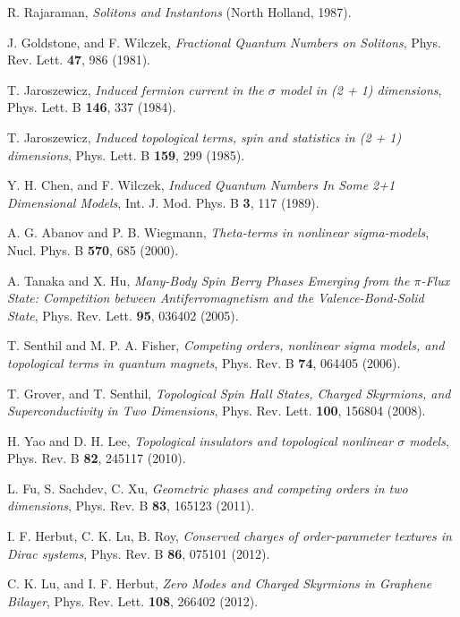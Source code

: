 \documentclass[aps,prb,amsmath,amssymb,floatfix,twocolumn]{revtex4}
\begin{document}
\begin{thebibliography}{}

 R. Rajaraman, {\it Solitons and Instantons} (North Holland, 1987).

 J. Goldstone, and F. Wilczek, \emph{Fractional Quantum Numbers on Solitons}, Phys. Rev. Lett. \textbf{47}, 986 (1981).

 T. Jaroszewicz, \emph{Induced fermion current in the $\sigma$ model in (2 + 1) dimensions}, Phys. Lett. B \textbf{146}, 337 (1984).

 T. Jaroszewicz, \emph{Induced topological terms, spin and statistics in (2 + 1) dimensions}, Phys. Lett. B \textbf{159}, 299 (1985).

 Y. H. Chen, and F. Wilczek, \emph{Induced Quantum Numbers In Some 2+1 Dimensional Models}, Int. J. Mod. Phys. B \textbf{3}, 117 (1989).

 A. G. Abanov and P. B. Wiegmann, \emph{Theta-terms in nonlinear sigma-models}, Nucl. Phys. B \textbf{570}, 685 (2000).

 A. Tanaka and X. Hu, \emph{Many-Body Spin Berry Phases Emerging from the $\pi$-Flux State: Competition between Antiferromagnetism and the Valence-Bond-Solid State}, Phys. Rev. Lett. \textbf{95}, 036402 (2005).

 T. Senthil and M. P. A. Fisher, \emph{Competing orders, nonlinear sigma models, and topological terms in quantum magnets}, Phys. Rev. B \textbf{74}, 064405 (2006).

 T. Grover, and T. Senthil,  \emph{Topological Spin Hall States, Charged Skyrmions, and Superconductivity in Two Dimensions}, Phys. Rev. Lett. \textbf{100}, 156804 (2008).

 H. Yao and D. H. Lee, \emph{Topological insulators and topological nonlinear $\sigma$ models}, Phys. Rev. B \textbf{82}, 245117 (2010).

 L. Fu, S. Sachdev, C. Xu, \emph{Geometric phases and competing orders in two dimensions}, Phys. Rev. B \textbf{83}, 165123 (2011).

 I. F. Herbut, C. K. Lu, B. Roy, \emph{Conserved charges of order-parameter textures in Dirac systems}, Phys. Rev. B \textbf{86}, 075101 (2012).

C. K. Lu, and I. F. Herbut, \emph{Zero Modes and Charged Skyrmions in Graphene Bilayer}, Phys. Rev. Lett. \textbf{108}, 266402 (2012).


\end{thebibliography}
\end{document}
